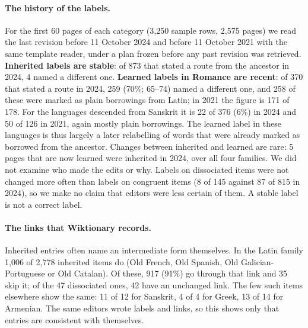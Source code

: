 \documentclass[11pt]{article}
\begin{document}
\paragraph{The history of the labels.} For the first 60 pages of each category (3,250 sample rows, 2,575 pages) we read the last revision before 11 October 2024 and before 11 October 2021 with the same template reader, under a plan frozen before any past revision was retrieved. \textbf{Inherited labels are stable}: of 873 that stated a route from the ancestor in 2024, 4 named a different one. \textbf{Learned labels in Romance are recent}: of 370 that stated a route in 2024, 259 (70\%; 65--74) named a different one, and 258 of these were marked as plain borrowings from Latin; in 2021 the figure is 171 of 178. For the languages descended from Sanskrit it is 22 of 376 (6\%) in 2024 and 50 of 126 in 2021, again mostly plain borrowings. The learned label in these languages is thus largely a later relabelling of words that were already marked as borrowed from the ancestor. Changes between inherited and learned are rare: 5 pages that are now learned were inherited in 2024, over all four families. We did not examine who made the edits or why. Labels on dissociated items were not changed more often than labels on congruent items (8 of 145 against 87 of 815 in 2024), so we make no claim that editors were less certain of them. A stable label is not a correct label.

\paragraph{The links that Wiktionary records.} Inherited entries often name an intermediate form themselves. In the Latin family 1,006 of 2,778 inherited items do (Old French, Old Spanish, Old Galician-Portuguese or Old Catalan). Of these, 917 (91\%) go through that link and 35 skip it; of the 47 dissociated ones, 42 have an unchanged link. The few such items elsewhere show the same: 11 of 12 for Sanskrit, 4 of 4 for Greek, 13 of 14 for Armenian. The same editors wrote labels and links, so this shows only that entries are consistent with themselves.
\end{document}
